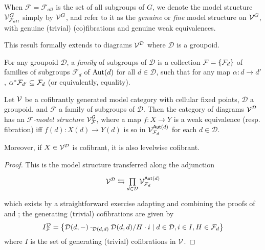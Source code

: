 \documentclass[a4paper,10pt
,draft
]{article}%
\renewcommand{\F}{\mathcal F}
\renewcommand{\1}{\eta}%
\begin{document}
\begin{notation}
      When $\F = \F_{all}$ is the set of all subgroups of $G$, we denote the model structure $\V^{G}_{\F_{all}}$ simply by $\mathcal V^G$,
      and refer to it as the \textit{genuine} or \textit{fine} model structure on $\mathcal V^G$,
      with genuine (trivial) (co)fibrations and genuine weak equivalences.
\end{notation}

This result formally extends to diagrams $\mathcal V^{\mathcal D}$ where $\mathcal D$ is a groupoid.
\begin{definition}
      For any groupoid $\mathcal D$, a \textit{family} of subgroups of $\mathcal D$ is
      a collection $\F = \set{\F_d}$ of families of subgroups $\F_d$ of $\operatorname{Aut}(d)$ for all $d \in \mathcal D$,
      such that for any map $\alpha: d \to d'$, $\alpha^{\**}\F_{d'} \subseteq \F_d$ (or equivalently, equality).
\end{definition}

\begin{proposition}
      \label{TRANS_MODEL_PROP}
      Let $\mathcal V$ be a cofibrantly generated model category with cellular fixed points, $\mathcal D$ a groupoid, and $\F$ a family of subgroups of $\mathcal D$.
      Then the category of diagrams $\mathcal V^{\mathcal D}$ has an \textit{$\F$-model structure} $\V^\G_\F$, where
      a map $f: X \to Y$ is a
      weak equivalence (resp. fibration) iff $f(d): X(d) \to Y(d)$ is so in $\V^{\mathsf{Aut}(d)}_{\F_d}$ for each $d \in \mathcal D$.

      Moreover, if $X \in \mathcal V^{\mathcal D}$ is cofibrant, it is also levelwise cofibrant.
\end{proposition}
\begin{proof}
      This is the model structure transferred along the adjunction
      \begin{equation}
            \begin{tikzcd}
                  \V^{\mathcal D} \leftrightarrows
                  \mathop{\prod}\limits_{d \in \mathcal D}\V^{\mathsf{Aut}(d)}_{\F_d}
            \end{tikzcd}
      \end{equation}
      which exists by a straightforward exercise adapting and combining the proofs of
      \cite[Thm 11.6.1]{Hir03} and \cite[Prop 2.6]{Ste16};
      the generating (trivial) cofibrations are given by
      \begin{equation}
            I^{\mathcal D}_\F = \sets{\mathcal D(d,-) \cdot_{\mathcal D(d,d)} \mathcal D(d,d)/H \cdot i}{d \in \mathcal D, i \in I, H \in \F_d}
      \end{equation}
      where $I$ is the set of generating (trivial) cofibrations in $\mathcal V$.
\end{proof}
\end{document}
